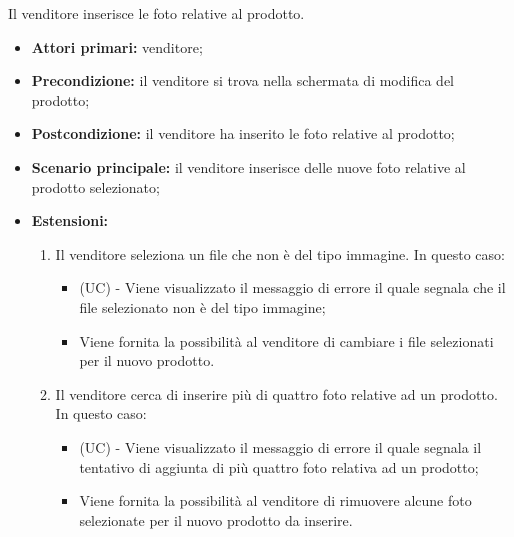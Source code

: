 Il venditore inserisce le foto relative al prodotto.
\begin{itemize}
    \item \textbf{Attori primari:} venditore;
    \item \textbf{Precondizione:} il venditore si trova nella schermata di modifica del prodotto;
    \item \textbf{Postcondizione:} il venditore ha inserito le foto relative al prodotto;
    \item \textbf{Scenario principale:} il venditore inserisce delle nuove foto relative al prodotto selezionato;
    \item \textbf{Estensioni:}
    \begin{enumerate}[label=\lett]
    	\item Il venditore seleziona un file che non è del tipo immagine. In questo caso:
		\begin{itemize}
			\item (UC) - Viene visualizzato il messaggio di errore il quale segnala che il file selezionato non è del tipo immagine;
			\item Viene fornita la possibilità al venditore di cambiare i file selezionati per il nuovo prodotto.
		\end{itemize}
		\item Il venditore cerca di inserire più di quattro foto relative ad un prodotto. In questo caso:
		\begin{itemize}
			\item (UC) - Viene visualizzato il messaggio di errore il quale segnala il tentativo di aggiunta di più quattro foto relativa ad un prodotto;
			\item Viene fornita la possibilità al venditore di rimuovere alcune foto selezionate per il nuovo prodotto da inserire.
		\end{itemize}
    \end{enumerate}
\end{itemize}

